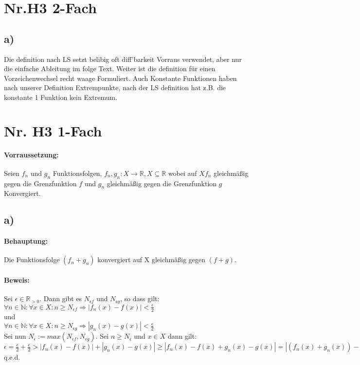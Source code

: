 \section*{Nr.H3 2-Fach}

\subsection*{a)}

Die definition nach LS setzt belibig oft diff'barkeit Vorraus verwendet,
aber nur die einfache Ableitung im folge Text.
Weiter ist die definition für einen Vorzeichenwechsel recht waage Formuliert.
Auch Konstante Funktionen haben nach unserer Definition Extrempunkte, nach der LS definition
hat z.B. die konstante 1 Funktion kein Extremum.


\section*{Nr. H3 1-Fach}

\paragraph*{Vorraussetzung:} Seien $f_{n}$ und $g_{n}$ Funktionsfolgen, $f_{n}, g_{n} : X \rightarrow \mathbb{R}, X \subseteq \mathbb{R}$ wobei auf $X f_{n}$ gleichmäßig gegen die Grenzfunktion $f$ und $g_{n}$ gleichmäßig gegen die Grenzfunktion $g$ Konvergiert.

\subsection*{a)}

\paragraph*{Behauptung:} Die Funktionsfolge $(f_{n}+g_{n})$ konvergiert auf X gleichmäßig gegen $(f+g)$.

\paragraph*{Beweis:} Sei $\epsilon \in \mathbb{R}_{>0}$. Dann gibt es $N_{\epsilon f}$ und $N_{\epsilon g}$, so dass gilt: \\
$\forall n \in \mathbb{N} :\forall x \in X: n \geq N_{\epsilon f} \Rightarrow |f_{n}(x)-f(x)| < \frac{\epsilon} {2}$\\
und \\
$\forall n \in \mathbb{N} :\forall x \in X: n \geq N_{\epsilon g} \Rightarrow |g_{n}(x)-g(x)| < \frac{\epsilon} {2}$ \\
Sei nun  $N_{\epsilon} := max(N_{\epsilon f}, N_{\epsilon g})$. Sei $n \geq N_{\epsilon}$ und $x \in X$ dann gilt: \\
$\epsilon = \frac{\epsilon} {2}+\frac{\epsilon} {2} > |f_{n}(x)-f(x)|+|g_{n}(x)-g(x)| \geq |f_{n}(x)-f(x)+g_{n}(x)-g(x)| = |(f_{n}(x)+g_{n}(x))-(f(x)+g(x))|$\\
q.e.d.

